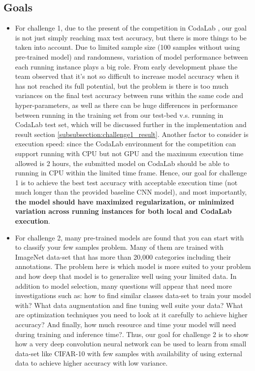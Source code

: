 \documentclass[10pt,twocolumn,letterpaper]{article}
\begin{document}
 \subsection{Goals}
 \label{subsection:intro_goals}
 \begin{itemize}
  \item For challenge 1, due to the present of the competition in CodaLab \cite{CodaLab_comp}, our goal is not just simply reaching max test accuracy, but there is more things to be taken into account. Due to limited sample size (100 samples without using pre-trained model) and randomness, variation of model performance between each running instance plays a big role. From early development phase the team observed that it's not so difficult to increase model accuracy when it has not reached its full potential, but the problem is there is too much variances on the final test accuracy between runs within the same code and hyper-parameters, as well as there can be huge differences in performance between running in the training set from our test-bed v.s. running in CodaLab test set, which will be discussed further in the implementation and result section \ref{subsubsection:challenge1_result}. Another factor to consider is execution speed: since the CodaLab environment for the competition can support running with CPU but not GPU and the maximum execution time allowed is 2 hours, the submitted model on CodaLab should be able to running in CPU within the limited time frame. Hence, our goal for challenge 1 is to achieve the best test accuracy with acceptable execution time (not much longer than the provided baseline CNN model), and most importantly, \textbf{the model should have maximized regularization, or minimized variation across running instances for both local and CodaLab execution}.       
  \item For challenge 2, many pre-trained models are found that you can start with to classify your few samples problem. Many of them are trained with ImageNet data-set \cite{deng2012imagenet} that has more than 20,000 categories including their annotations. The problem here is which model is more suited to your problem and how deep that model is to generalize well using your limited data. In addition to model selection, many questions will appear that need  more investigations such as: how to find similar classes data-set to train your model with? What data augmentation and fine tuning well suite your data? What are optimization techniques you need to look at it carefully to achieve higher accuracy? And finally, how much resource and time your model will need during training and inference time?. Thus, our goal for challenge 2 is to show how a very deep convolution neural network can be used to learn from small data-set like CIFAR-10 with few samples with availability of using  external data to achieve higher accuracy with low variance.

  
\end{itemize}
 
\end{document}
